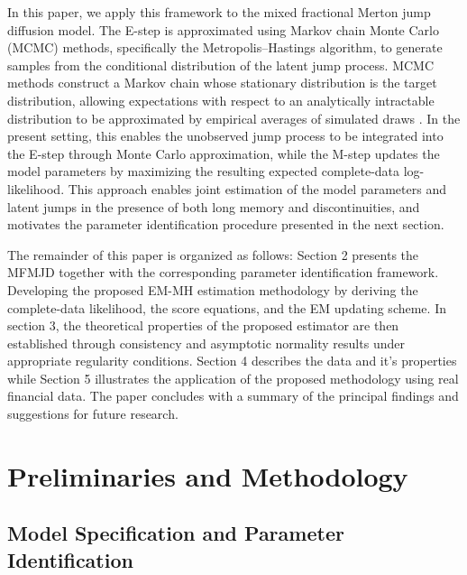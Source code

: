 \documentclass[a4paper,11pt]{amsart}
\theoremstyle{definition}
\theoremstyle{plain}
\theoremstyle{remark}
\newcommand{\1}{\mathbf{1}}
\begin{document}
In this paper, we apply this framework to the mixed fractional Merton jump diffusion model. The E-step is approximated using Markov chain Monte Carlo (MCMC) methods, specifically the Metropolis--Hastings algorithm, to generate samples from the conditional distribution of the latent jump process. MCMC methods construct a Markov chain whose stationary distribution is the target distribution, allowing expectations with respect to an analytically intractable distribution to be approximated by empirical averages of simulated draws \cite{RobertCasella2004,BrooksGelmanJonesMeng2011}. In the present setting, this enables the unobserved jump process to be integrated into the E-step through Monte Carlo approximation, while the M-step updates the model parameters by maximizing the resulting expected complete-data log-likelihood. This approach enables joint estimation of the model parameters and latent jumps in the presence of both long memory and discontinuities, and motivates the parameter identification procedure presented in the next section.

The remainder of this paper is organized as follows: Section 2 presents the MFMJD together with the corresponding parameter identification framework. Developing the proposed EM-MH estimation methodology by deriving the complete-data likelihood, the score equations, and the EM updating scheme. In section 3,  the theoretical properties of the proposed estimator are then established through consistency and asymptotic normality results under appropriate regularity conditions. Section 4 describes the data and it's properties while Section 5 illustrates the application of the proposed methodology using real financial data. The paper concludes with a summary of the principal findings and suggestions for future research.


\section{Preliminaries and Methodology}
\subsection{Model Specification and Parameter Identification}\mbox{}\\
\end{document}
